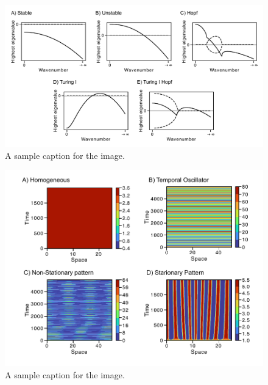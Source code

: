 
\begin{figure}[H] %
    \centering
    \includegraphics[width=1\textwidth]{chapters/Chapter 1/dispersions} %
    \caption{A sample caption for the image.}
    \label{fig:dispersions} %
\end{figure}

\begin{figure}[H] %
    \centering
    \includegraphics[width=1\textwidth]{chapters/Chapter 1/numerical_patterns} %
    \caption{A sample caption for the image.}
    \label{fig:numerical_patterns} %
\end{figure}

